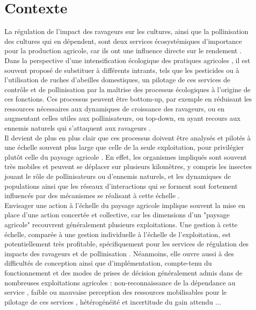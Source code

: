 \documentclass[11pt,a4paper,final]{article}
\author{Antoine}
\begin{document}
\section{Contexte}

La régulation de l'impact des ravageurs sur les cultures, ainsi que la pollinisation des cultures qui en dépendent, sont deux services écosystémiques d'importance pour la production agricole, car ils ont une influence directe sur le rendement \cite{oerke_crop_2006,garibaldi_global_2011}.\\

Dans la perspective d'une intensification écologique des pratiques agricoles \cite{bommarco_ecological_2013}, il est souvent proposé de substituer à différents intrants, tels que les pesticides ou à l'utilisation de ruches d'abeilles domestiques, un pilotage de ces services de contrôle et de pollinisation par la maîtrise des processus écologiques à l'origine de ces fonctions. Ces processus peuvent être bottom-up, par exemple en réduisant les ressources nécessaires aux dynamiques de croissance des ravageurs, ou en augmentant celles utiles aux pollinisateurs, ou top-down, en ayant recours aux ennemis naturels qui s'attaquent aux ravageurs \cite{brevault_pest_2019}.\\

Il devient de plus en plus clair que ces processus doivent être analysés et pilotés à une échelle souvent plus large que celle de la seule exploitation, pour privilégier plutôt celle du paysage agricole \cite{landis_designing_2017}. En effet, les organismes impliqués sont souvent très mobiles et peuvent se déplacer sur plusieurs kilomètres, y compris les insectes jouant le rôle de pollinisateurs ou d'ennemis naturels, et les dynamiques de populations ainsi que les réseaux d'interactions qui se forment sont fortement influencés par des mécanismes se réalisant à cette échelle \cite{kremen_pollination_2007}. \\

Envisager une action à l'échelle du paysage agricole implique souvent la mise en place d'une action concertée et collective, car les dimensions d'un "paysage agricole" recouvrent généralement plusieurs exploitations. Une gestion à cette échelle, comparée à une gestion individuelle à l'échelle de l'exploitation, est potentiellement très profitable, spécifiquement pour les services de régulation des impacts des ravageurs et de pollinisation \cite{stallman_ecosystem_2011}. Néanmoins, elle ouvre aussi à des difficultés de conception ainsi que d'implémentation, compte-tenu du fonctionnement et des modes de prises de décision généralement admis dans de nombreuses exploitations agricoles : non-reconnaissance de la dépendance au service \cite{smith_ecosystem_2014}, faible ou mauvaise perception des ressources mobilisables pour le pilotage de ces services \cite{salliou_landscape_2017}, hétérogénéité et incertitude du gain attendu \cite{stallman_determinants_2015}...\\
\end{document}

